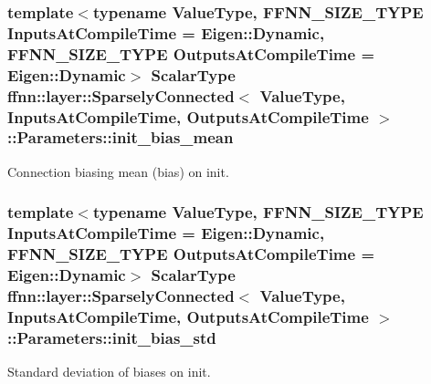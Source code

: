 \hypertarget{structffnn_1_1layer_1_1_sparsely_connected_1_1_parameters_ad19efad752312f71c26108e882e53581}{
\subsubsection[{init\-\_\-bias\-\_\-mean}]{\setlength{\rightskip}{0pt plus 5cm}template$<$typename Value\-Type, F\-F\-N\-N\-\_\-\-S\-I\-Z\-E\-\_\-\-T\-Y\-P\-E Inputs\-At\-Compile\-Time = Eigen\-::\-Dynamic, F\-F\-N\-N\-\_\-\-S\-I\-Z\-E\-\_\-\-T\-Y\-P\-E Outputs\-At\-Compile\-Time = Eigen\-::\-Dynamic$>$ {\bf Scalar\-Type} {\bf ffnn\-::layer\-::\-Sparsely\-Connected}$<$ Value\-Type, Inputs\-At\-Compile\-Time, Outputs\-At\-Compile\-Time $>$\-::Parameters\-::init\-\_\-bias\-\_\-mean}}\label{structffnn_1_1layer_1_1_sparsely_connected_1_1_parameters_ad19efad752312f71c26108e882e53581}


Connection biasing mean (bias) on init. 

\hypertarget{structffnn_1_1layer_1_1_sparsely_connected_1_1_parameters_a1519128b112ea0cf4a4d021c363bb48c}{
\subsubsection[{init\-\_\-bias\-\_\-std}]{\setlength{\rightskip}{0pt plus 5cm}template$<$typename Value\-Type, F\-F\-N\-N\-\_\-\-S\-I\-Z\-E\-\_\-\-T\-Y\-P\-E Inputs\-At\-Compile\-Time = Eigen\-::\-Dynamic, F\-F\-N\-N\-\_\-\-S\-I\-Z\-E\-\_\-\-T\-Y\-P\-E Outputs\-At\-Compile\-Time = Eigen\-::\-Dynamic$>$ {\bf Scalar\-Type} {\bf ffnn\-::layer\-::\-Sparsely\-Connected}$<$ Value\-Type, Inputs\-At\-Compile\-Time, Outputs\-At\-Compile\-Time $>$\-::Parameters\-::init\-\_\-bias\-\_\-std}}\label{structffnn_1_1layer_1_1_sparsely_connected_1_1_parameters_a1519128b112ea0cf4a4d021c363bb48c}


Standard deviation of biases on init. 

